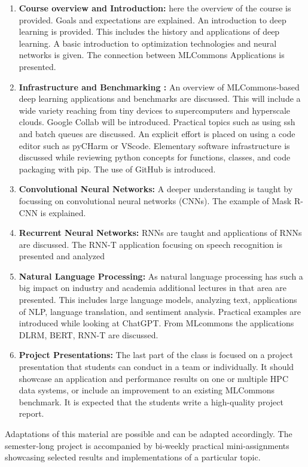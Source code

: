 \begin{enumerate}
  
\item{\bf Course overview and Introduction:} here the overview of the
  course is provided. Goals and expectations are explained. An
  introduction to deep learning is provided. This includes the history and
  applications of deep learning. A basic introduction to optimization
  technologies and neural networks is given. The connection between
  MLCommons Applications is presented.

\item{\bf Infrastructure and Benchmarking :} An overview of
  MLCommons-based deep learning applications and benchmarks are
  discussed. This will include a wide variety reaching from tiny
  devices to supercomputers and hyperscale clouds. Google Collab will
  be introduced. Practical topics such as using ssh and batch queues
  are discussed. An explicit effort is placed on using a code editor
  such as pyCHarm or VScode. Elementary software infrastructure is
  discussed while reviewing python concepts for functions, classes,
  and code packaging with pip. The use of GitHub is introduced.
  
\item{\bf Convolutional Neural Networks:} A deeper understanding is taught
  by focussing on convolutional neural networks (CNNs). The example of
  Mask R-CNN is explained.

\item{\bf Recurrent Neural Networks:} RNNs are taught and applications of
  RNNs are discussed. The RNN-T application focusing on speech
  recognition is presented and analyzed

\item{\bf Natural Language Processing:} As natural language processing has
  such a big impact on industry and academia additional lectures in that area
   are presented. This includes large language models,
  analyzing text, applications of NLP, language translation, and sentiment
  analysis.  Practical examples are introduced while looking at
  ChatGPT. From MLcommons the applications DLRM, BERT, RNN-T are
  discussed.

\item{\bf Project Presentations:} The last part of the class is
  focused on a project presentation that students can conduct in a
  team or individually. It should showcase an application and
  performance results on one or multiple HPC data systems, or include
  an improvement to an existing MLCommons benchmark. It is expected
  that the students write a high-quality project report.
  
 \end{enumerate}

Adaptations of this material are possible and can be adapted
accordingly. The semester-long project is accompanied by bi-weekly
practical mini-assignments showcasing selected results and
implementations of a particular topic.
